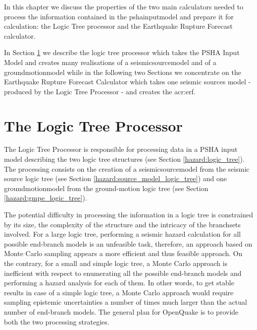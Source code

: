 In this chapter we discuss the properties of the two main calculators 
needed to process the information contained in the \gls{pshainputmodel} 
and prepare it for calculation: the Logic Tree processor and the 
Earthquake Rupture Forecast calculator. 

In Section \ref{hazard:logic_tree_processor} we describe the logic 
tree processor which takes the PSHA Input Model and creates many 
realisations of a \gls{seismicsourcemodel} and of a 
\gls{groundmotionmodel} while in the following two Sections we concentrate 
on the Earthquake Rupture Forecast Calculator which takes one seismic
sources model - produced by the Logic Tree Processor - and creates 
the \gls{acr:erf}.  
%
\section{The Logic Tree Processor}
\label{hazard:logic_tree_processor}
%
The Logic Tree Processor is responsible for processing data in a 
PSHA input model describing the two logic tree structures
(see Section \ref{hazard:logic_tree}). 
%
The processing consists on the creation of a \gls{seismicsourcemodel} 
from the seismic source logic tree (see Section 
\ref{hazard:source_model_logic_tree}) and one \gls{groundmotionmodel} 
from the ground-motion logic tree (see Section \ref{hazard:gmpe_logic_tree}). 
%

The potential difficulty in processing the information in a logic tree 
is constrained by its size, the complexity of the structure and the 
intricacy of the \glspl{branchset} involved.
%
For a large logic tree, performing a seismic hazard calculation for 
all possible end-branch models is an unfeasible task, therefore, 
an approach based on Monte Carlo sampling appears a more efficient and
thus feasible approach. 
%
On the contrary, for a small and simple logic tree, a Monte Carlo 
approach is inefficient with respect to enumerating all the possible 
end-branch models and performing a hazard analysis for each of them. 
%
In other words, to get stable results in case of a simple logic tree, 
a Monte Carlo approach would require sampling epistemic uncertainties 
a number of times much larger than the actual number of end-branch models.
%
The general plan for OpenQuake is to provide both the two processing 
strategies. 

